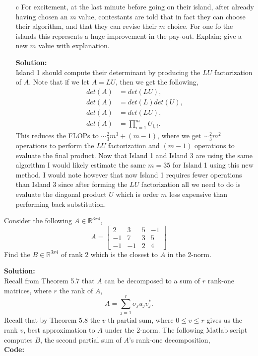 \documentclass[12pt]{article}
\makeatletter
\theoremstyle{homework}
\newenvironment{exercise}[1]
{\def\@currentlabel{#1}\exercisecore}
{\endexercisecore}
\newcommand{\localhead}[1]{\par\smallskip\noindent\textbf{#1}\nobreak\\}%
\newcommand\solution{\localhead{Solution:}}
\newcommand{\Reals}{\ensuremath{\mathbb R}}
\let\RR\Reals
\makeatother
\begin{document}
\begin{exercise}{F2}
\begin{enumerate}
    \item[c] For excitement, at the last minute before going on their island, after already having chosen an $m$ value, contestants are told that in fact they can choose their algorithm, and that they can 
    revise their $m$ choice. For one fo the islands this represents a huge improvement in the pay-out. Explain; give a new $m$ value with explanation.\\
    \solution Island 1 should compute their determinant by producing the $LU$ factorization of $A$. Note that if we let $A = LU$, then we get the following, 
    \begin{align*}
      det(A) &= det(LU),\\
      det(A) &= det(L)det(U),\\
      det(A) &= det(LU),\\
      det(A) &= \prod_{i = 1}^m U_{i, i}.
    \end{align*}
    This reduces the FLOPs to $ \sim \frac{2}{3}m^3 + (m-1)$, where we get $ \sim \frac{2}{3}m^2 $ operations to perform the $LU$ factorization and $(m-1)$ operations to evaluate the final product. Now that 
    Island 1 and Island 3 are using the same algorithm I would likely estimate the same $m = 35$ for Island 1 using this new method. I would note however that now Island 1 requires fewer operations than Island 3 since 
    after forming the $LU$ factorization all we need to do is evaluate the diagonal product $U$ which is order $m$ less expensive than performing back substitution.  
   \end{enumerate}
\end{exercise}
\newpage

\begin{exercise}{F3} Consider the following $A \in \RR^{3x4}$,
  \begin{equation*}
    A = \begin{bmatrix}
      2 &3 &5& -1\\
      -1& 7 &3 &5\\
      -1& -1& 2& 4
    \end{bmatrix}
  \end{equation*}
  Find the $B \in \RR^{3x4}$ of rank 2 which is the closest to $A$ in the 2-norm. \\
  \solution Recall from Theorem 5.7 that $A$ can be decomposed to a sum of $r$ rank-one matrices, where $r$ the rank of $A$, 
  \begin{equation*}
    A = \sum_{j = 1}^r \sigma_j u_j v^*_j.
  \end{equation*}
  Recall that by Theorem 5.8 the $v$ th partial sum, where $0 \leq v \leq r$ gives us the rank $v$, best approximation to $A$ under the 2-norm.
  The following Matlab script computes $B$, the second partial sum of $A$'s rank-one decomposition,\\
  \textbf{Code:}
  \begin{center}
  
  \end{center} 
\end{exercise}
\newpage
\end{document}

